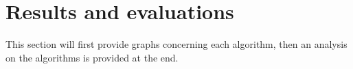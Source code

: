 \documentclass[10pt,conference,compsocconf]{IEEEtran}
\begin{document}



\section{Results and evaluations}
This section will first provide graphs concerning each algorithm, then an analysis on the algorithms is provided at the end.
\end{document}
